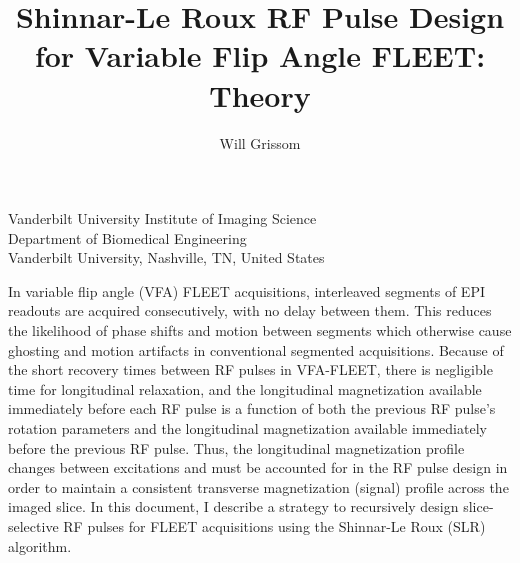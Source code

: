 \documentclass[11pt]{article}
\begin{document}
\newpage

\title{Shinnar-Le Roux RF Pulse Design for Variable Flip Angle FLEET: Theory}
\author{Will Grissom}
\maketitle
\begin{flushleft}
Vanderbilt University Institute of Imaging Science \\
Department of Biomedical Engineering \\
Vanderbilt University, Nashville, TN, United States \\
\end{flushleft}
\thispagestyle{plain}

\pagebreak

In variable flip angle (VFA) FLEET acquisitions, 
interleaved segments of EPI readouts are acquired consecutively, 
with no delay between them. 
This reduces the likelihood of phase shifts and motion between segments which otherwise 
cause ghosting and motion artifacts in conventional segmented acquisitions. 
Because of the short recovery times between RF pulses in VFA-FLEET,
there is negligible time for longitudinal relaxation, 
and the longitudinal magnetization available immediately before each RF pulse is a function of both 
the previous RF pulse's rotation parameters
and the longitudinal magnetization available immediately before the previous RF pulse.
Thus, the longitudinal magnetization profile changes between excitations and must be accounted for in the RF pulse design in order
to maintain a consistent transverse magnetization (signal) profile across the imaged slice. 
In this document, I describe a strategy to recursively design slice-selective RF pulses for FLEET acquisitions using the Shinnar-Le Roux (SLR) algorithm.
\end{document}
